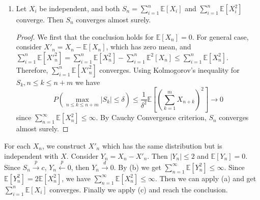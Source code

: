 \documentclass{article}
\begin{document}
\begin{enumerate}
\begin{enumerate}
\begin{proof}
        \end{proof}
        \item Let $X_i$ be independent,
        and both $S_n=\sum_{i=1}^{n} \mathbb{E}[X_i]$ and
        $\sum_{i=1}^{n} \mathbb{E}[X^2_i]$ converge.
        Then $S_n$ converges almost surely.
        \begin{proof}
            We first that the conclusion holds for $\mathbb{E}[X_n]=0$.
            For general case, consider $X'_n = X_n -\mathbb{E}[X_n]$, which has zero mean,
            and $\sum_{i=1}^n \mathbb{E}[X'^2_n] = \sum_{i=1}^n \mathbb{E}[X^2_n] - \sum_{i=1}^n \mathbb{E}^2[X_n]
            \leq \sum_{i=1}^n \mathbb{E}[X^2_n]$.
            Therefore, $\sum_{i=1}^n \mathbb{E}[X'^2_n]$
            converges.
            Using Kolmogorov's inequality for $S_k,  n \leq k \leq n+m$ we have
    $$
    P(\max_{n\leq k \leq n+m} |S_k| \leq \delta)
    \leq \frac{1}{\delta^2} \mathbb{E}[(\sum_{k=1}^{m} X_{n+k})^2] \to 0
    $$
    since $\sum_{n=1}^{\infty}\mathbb{E}[X^2_n] \leq \infty$.
    By Cauchy Convergence criterion, $S_n$ converges almost
    surely.
        \end{proof}
    \end{enumerate}
    For each $X_n$, we construct $X'_n$ which has the
    same distribution but is independent  with $X$.
    Consider $Y_n = X_n - X'_n$. Then $|Y_n| \leq 2$
    and $\mathbb{E}[Y_n]=0$.
    Since $S_n \xrightarrow{p} c$, $Y_n \xleftarrow{p} 0$, then $Y_n \xrightarrow{d} 0$.
    By (b) we get $\sum_{n=1}^{\infty}\mathbb{E}[Y^2_n] \leq \infty$. Since $\mathbb{E}[Y^2_n]=2\mathbb{E}[X^2_n]$,
    we have $\sum_{n=1}^{\infty}\mathbb{E}[X^2_n] \leq \infty$.
    Then we can apply (a) and get $ \sum_{i=1}^{n} \mathbb{E}[X_i]$ converges. Finally we apply (c) and
    reach the conclusion.
\end{enumerate}
\end{document}
